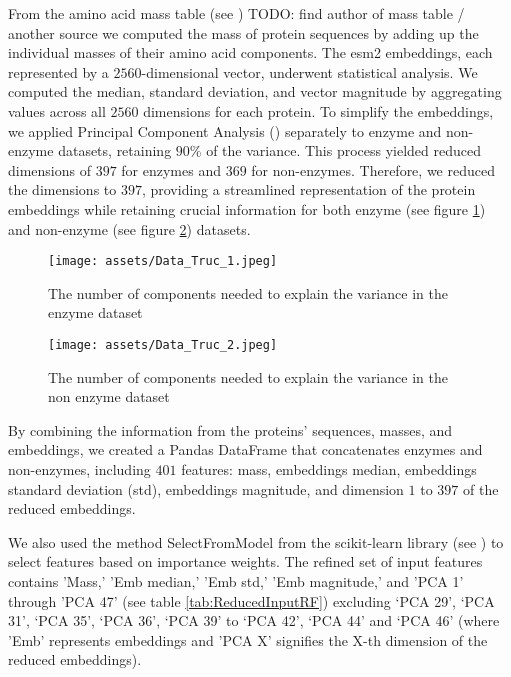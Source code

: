 \documentclass{bioinfo}
\begin{document}
\begin{methods}
From the amino acid mass table (see \cite{BioinformaticsSolutionsInc}) TODO: find author of mass table / another source
we computed the mass of protein sequences by adding up the individual masses of their amino acid components.
The esm2 embeddings, each represented by a $2560$-dimensional vector, underwent statistical analysis.
We computed the median, standard deviation, and vector magnitude by aggregating values across all $2560$ dimensions for each protein.
To simplify the embeddings, we applied Principal Component Analysis (\cite{scikit-learn})
separately to enzyme and non-enzyme datasets,
retaining $90\%$ of the variance. This process yielded reduced dimensions of $397$ for enzymes and $369$ for non-enzymes. 
Therefore, we reduced the dimensions to $397$, providing a streamlined representation of the protein embeddings while retaining crucial information for both 
enzyme (see figure \ref{fig:PCA_enzymes}) and non-enzyme (see figure \ref{fig:PCA_nonEnzymes}) datasets.

\begin{figure}[!bp]
\texttt{[image: assets/Data\_Truc\_1.jpeg]}
\caption{The number of components needed to explain the variance in the enzyme dataset}\label{fig:PCA_enzymes}
\end{figure}

\begin{figure}[!tbp]
\texttt{[image: assets/Data\_Truc\_2.jpeg]}
\caption{The number of components needed to explain the variance in the non enzyme dataset}\label{fig:PCA_nonEnzymes}
\end{figure}


By combining the information from the proteins’ sequences, masses, and embeddings, we created a Pandas DataFrame that concatenates enzymes and non-enzymes,
including $401$ features: mass, embeddings median, embeddings standard deviation (std), embeddings magnitude, and dimension $1$ to $397$ of the reduced 
embeddings. 

We also used the method SelectFromModel from the scikit-learn library (see \cite{scikit-learn})
to select features based on importance weights. 
The refined set of input features contains 
'Mass,' 'Emb median,' 'Emb std,' 'Emb magnitude,' and 'PCA 1' through 'PCA 47' (see table \ref{tab:ReducedInputRF}) excluding ‘PCA 29’, ‘PCA 31’, ‘PCA 35’, 
‘PCA 36’, ‘PCA 39’ to ‘PCA 42’, ‘PCA 44’ and ‘PCA 46’ (where 'Emb' represents embeddings and 'PCA X' signifies the X-th dimension of the reduced embeddings).


\end{methods}
\end{document}
